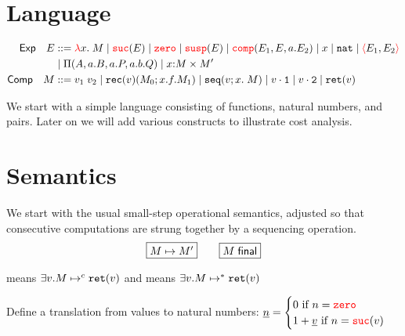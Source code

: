 \section{Language}

\begin{align*}
    \mathsf{Exp} \quad E &::= \lam{x}{A}{M} 
    \mid \suc{E}
    \mid \zero 
    \mid \susp{E}
    \mid \ccomp{E_1}{E}{a.E_2}
    \mid x
    \mid \nat
    \mid \pair{E_1}{E_2}\\
    &\mid \arrabt{A}{a.B}{a.P,a.b.Q}
    \mid \dprod{\isOf{x}{M}}{M'}\\
    \mathsf{Comp} \quad M &::= 
     v_1 \; v_2
    \mid \rec{v}{M_0}{x}{f}{M_1}
    \mid \seq{v}{x}{M}
    \mid \fst{v}
    \mid \snd{v}
    \mid \ret{v}\\
\end{align*}

We start with a simple language consisting of functions, natural numbers, and pairs. Later on we will add
various constructs to illustrate cost analysis.
\section{Semantics}
We start with the usual small-step operational semantics, adjusted so that consecutive computations are 
strung together by a sequencing operation.
\[
\fbox{$\step{M}{M'}$} \quad\quad \fbox{$\final{M}$}
\]

\begin{mathpar}








\end{mathpar}

 means $\exists v. \stepIn{M}{c}{\ret{v}}$ and  means $\exists v.
\stepIn{M}{*}{\ret{v}}$

Define a translation from values to natural numbers: 
$\toNat{n} = \begin{cases} 0 \text{ if } n = \zero\\
1+\toNat{v} \text{ if } n = \suc{v} \end{cases}$


